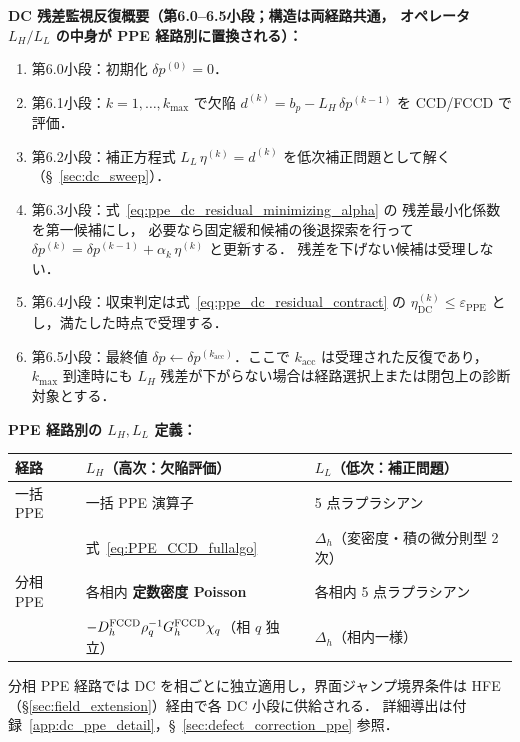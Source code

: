 \noindent\textbf{DC 残差監視反復概要（第6.0--6.5小段；構造は両経路共通，
オペレータ $L_H/L_L$ の中身が PPE 経路別に置換される）：}
\begin{enumerate}[leftmargin=2em,noitemsep]
  \item 第6.0小段：初期化 $\delta p^{(0)} = 0$．
  \item 第6.1小段：$k=1,\ldots,k_{\max}$ で欠陥 $d^{(k)} = b_p - L_H\,\delta p^{(k-1)}$ を CCD/FCCD で評価．
  \item 第6.2小段：補正方程式 $L_L\,\eta^{(k)} = d^{(k)}$ を低次補正問題として解く（§~\ref{sec:dc_sweep}）．
  \item 第6.3小段：式~\eqref{eq:ppe_dc_residual_minimizing_alpha} の
        残差最小化係数を第一候補にし，
        必要なら固定緩和候補の後退探索を行って
        $\delta p^{(k)} = \delta p^{(k-1)} + \alpha_k\,\eta^{(k)}$ と更新する．
        残差を下げない候補は受理しない．
  \item 第6.4小段：収束判定は式~\eqref{eq:ppe_dc_residual_contract} の
        $\eta_{\mathrm{DC}}^{(k)}\le\varepsilon_{\mathrm{PPE}}$ とし，満たした時点で受理する．
  \item 第6.5小段：最終値 $\delta p \leftarrow \delta p^{(k_\mathrm{acc})}$．ここで
        $k_\mathrm{acc}$ は受理された反復であり，$k_{\max}$ 到達時にも
        $L_H$ 残差が下がらない場合は経路選択上または閉包上の診断対象とする．
\end{enumerate}

\noindent\textbf{PPE 経路別の $L_H, L_L$ 定義：}
\begin{center}
\renewcommand{\arraystretch}{\PaperTableArrayStretch}
\begin{tabular}{@{}lll@{}}
\hline
経路 & $L_H$（高次：欠陥評価） & $L_L$（低次：補正問題） \\
\hline
一括 PPE & 一括 PPE 演算子 & 5 点ラプラシアン \\
 & 式~\eqref{eq:PPE_CCD_fullalgo} & $\Delta_h$（変密度・積の微分則型 2 次） \\
分相 PPE & 各相内 \textbf{定数密度 Poisson} & 各相内 5 点ラプラシアン \\
 & $-D_h^{\mathrm{FCCD}}\rho_q^{-1}G_h^{\mathrm{FCCD}}\chi_q$（相 $q$ 独立） & $\Delta_h$（相内一様） \\
\hline
\end{tabular}
\end{center}
分相 PPE 経路では DC を相ごとに独立適用し，界面ジャンプ境界条件は HFE
（§\ref{sec:field_extension}）経由で各 DC 小段に供給される．
詳細導出は付録~\ref{app:dc_ppe_detail}，§~\ref{sec:defect_correction_ppe} 参照．

